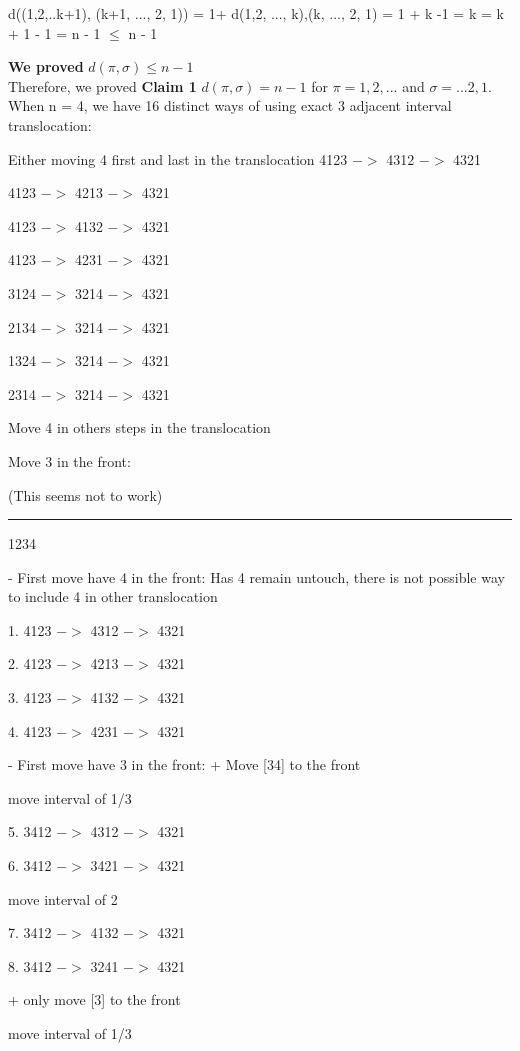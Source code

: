 \documentclass[runningheads]{llncs}
\begin{document}
d((1,2,..k+1), (k+1, ..., 2, 1)) = 1+ d(1,2, ..., k),(k, ..., 2, 1) = 1 + k -1 = k = k + 1 - 1 = n - 1 $\leq$ n - 1

\textbf{We proved} {\bf $d(\pi,\sigma) \leq n-1$} \\

Therefore, we proved \textbf{Claim 1}  $d(\pi,\sigma)=n-1$ for $\pi=1,2,...$ and $\sigma=...2,1$.\\



When n = 4, we have 16 distinct ways of using exact 3 adjacent interval translocation:

Either moving 4 first and last in the translocation
4123 $->$ 4312 $->$ 4321

4123 $->$ 4213 $->$ 4321

4123 $->$ 4132 $->$ 4321

4123 $->$ 4231 $->$ 4321

3124 $->$ 3214 $->$ 4321

2134 $->$ 3214 $->$ 4321

1324 $->$ 3214 $->$ 4321

2314 $->$ 3214 $->$ 4321

Move 4 in others steps in the translocation 

Move 3 in the front:

(This seems not to work)

\rule{8cm}{0.4pt}

1234

- First move have 4 in the front:
Has 4 remain untouch, there is not possible way to include 4 in other translocation

1. 4123 $->$ 4312 $->$ 4321

2. 4123 $->$ 4213 $->$ 4321

3. 4123 $->$ 4132 $->$ 4321

4. 4123 $->$ 4231 $->$ 4321

- First move have 3 in the front: 
+ Move [34] to the front

move interval of 1/3

5. 3412 $->$ 4312 $->$ 4321

6. 3412 $->$ 3421 $->$ 4321

move interval of 2

7. 3412 $->$ 4132 $->$ 4321

8. 3412 $->$ 3241 $->$ 4321

+ only move [3] to the front 

move interval of 1/3
\end{document}
